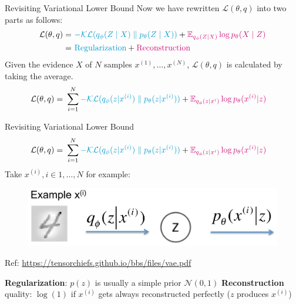 \documentclass{beamer}
\begin{document}
\begin{frame}{Revisiting Variational Lower Bound}
%
Now we have rewritten $\mathcal{L}(\theta,q)$ into two parts as follows:
%
\begin{align*}
  \mathcal{L}(\theta,q)
  =&~
  \textcolor{DeepSkyBlue3}{-
  \mathcal{KL}(q_{\phi}(Z\mid X)\parallel p_{\theta}(Z\mid X))}
  +
  \textcolor{DeepPink3}{
  \mathbb{E}_{q_{\phi}(Z\mid X)}\log{p_{\theta}(X \mid Z)}}\\
  =&~
  \text{\textcolor{DeepSkyBlue3}{Regularization}}+
  \text{\textcolor{DeepPink3}{Reconstruction}}
\end{align*}
%
Given the evidence $X$ of $N$ samples $x^{(1)},\dots,x^{(N)}$, $\mathcal{L}(\theta,q)$ is calculated by taking the average.
%
\begin{align*}
  \mathcal{L}(\theta,q)
  =&~\sum_{i=1}^{N}
  \textcolor{DeepSkyBlue3}{-
  \mathcal{KL}(q_{\phi}(z| x^{(i)})\parallel p_{\theta}(z| x^{(i)}))}
  +
  \textcolor{DeepPink3}{
  \mathbb{E}_{q_{\phi}(z|x^i)}\log{p_{\theta}(x^{(i)}
  | z)}}
\end{align*}

\end{frame}
\begin{frame}{Revisiting Variational Lower Bound}
%
\begin{align*}
  \mathcal{L}(\theta,q)
  =&~\sum_{i=1}^{N}
  \textcolor{DeepSkyBlue3}{-
  \mathcal{KL}(q_{\phi}(z| x^{(i)})\parallel p_{\theta}(z| x^{(i)}))}
  +
  \textcolor{DeepPink3}{
  \mathbb{E}_{q_{\phi}(z|x^i)}\log{p_{\theta}(x^{(i)}
  | z)}}
\end{align*}
%
\indent Take $x^{(i)}, i\in{1,\dots,N}$ for example:
%
\begin{figure}
    \centering
    \includegraphics[width=0.6\columnwidth]{exp/regu+reco.png}
\end{figure}
\begin{center}
{\small \textcolor{BGpurple}
{Ref: \url{https://tensorchiefs.github.io/bbs/files/vae.pdf}}}
\end{center}
\noindent\textcolor{DeepSkyBlue3}{\bf Regularization}:
  $p(z)$ is usually a simple prior $\mathcal{N}(0,1)$
\noindent\textcolor{DeepPink3}{\bf Reconstruction} quality: $\log(1)$ if $x^{(i)}$ gets always reconstructed perfectly ($z$ produces $x^{(i)}$)
\end{frame}
\end{document}

